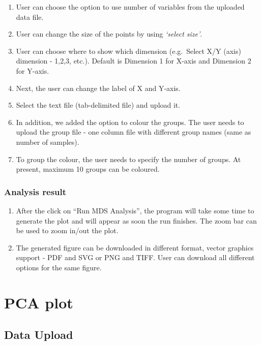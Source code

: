 \documentclass[
  a4paper,
  oneside,
  open=any]{scrreport}
\providecommand{\tightlist}{%
  \setlength{\itemsep}{0pt}\setlength{\parskip}{0pt}}\usepackage{longtable,booktabs,array}
\begin{document}
\begin{enumerate}
\def\labelenumi{\arabic{enumi}.}
\tightlist
\item
  User can choose the option to use number of variables from the
  uploaded data file.
\item
  User can change the size of the points by using \emph{`select size'}.
\item
  User can choose where to show which dimension (e.g.~Select X/Y (axis)
  dimension - 1,2,3, etc.). Default is Dimension 1 for X-axis and
  Dimension 2 for Y-axis.
\item
  Next, the user can change the label of X and Y-axis.
\item
  Select the text file (tab-delimited file) and upload it.
\item
  In addition, we added the option to colour the groups. The user needs
  to upload the group file - one column file with different group names
  (same as number of samples).
\item
  To group the colour, the user needs to specify the number of groups.
  At present, maximum 10 groups can be coloured.
\end{enumerate}

\hypertarget{analysis-result}{%
\subsubsection{Analysis result}\label{analysis-result}}

\begin{enumerate}
\def\labelenumi{\arabic{enumi}.}
\tightlist
\item
  After the click on ``Run MDS Analysis'', the program will take some
  time to generate the plot and will appear as soon the run finishes.
  The zoom bar can be used to zoom in/out the plot.
\item
  The generated figure can be downloaded in different format, vector
  graphics support - PDF and SVG or PNG and TIFF. User can download all
  different options for the same figure.\\
\end{enumerate}

\hypertarget{pca-plot}{%
\section{PCA plot}\label{pca-plot}}

\hypertarget{data-upload-2}{%
\subsection{Data Upload}\label{data-upload-2}}
\end{document}
